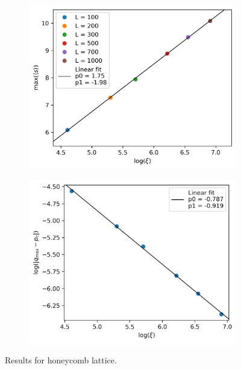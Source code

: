 \documentclass[a4paper]{article}
\begin{document}
\begin{figure}[h]
    \\\vspace{4mm}%
    \begin{subfigure}[b]{0.49\textwidth}
        \includegraphics[width=\textwidth]{honeycomb_clustersize_vs_xi.png}
        \caption{}
    \end{subfigure}
    \begin{subfigure}[b]{0.49\textwidth}
        \includegraphics[width=\textwidth]{honeycomb_qmax_vs_xi.png}
        \caption{}
    \end{subfigure}
    \caption{Results for honeycomb lattice. \label{fig:honeycomb_results}}
\end{figure}
\end{document}
